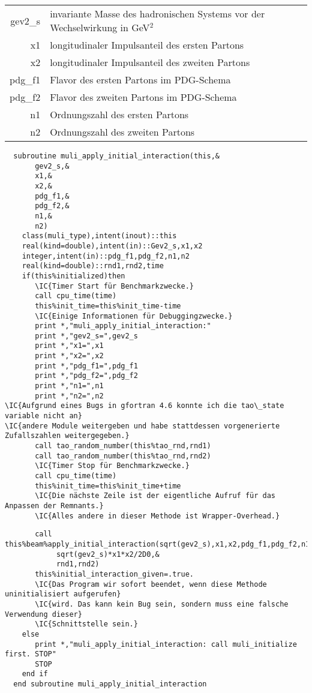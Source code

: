 \begin{tabular}{rl}
  gev2\_s&invariante Masse des hadronischen Systems vor der Wechselwirkung in GeV$^2$\\
  x1&longitudinaler Impulsanteil des ersten Partons\\
  x2&longitudinaler Impulsanteil des zweiten Partons\\
  pdg\_f1&Flavor des ersten Partons im PDG-Schema\\
  pdg\_f2&Flavor des zweiten Partons im PDG-Schema\\
  n1&Ordnungszahl des ersten Partons\\
  n2&Ordnungszahl des zweiten Partons
\end{tabular}
\begin{Verbatim}
  subroutine muli_apply_initial_interaction(this,&
       gev2_s,&
       x1,&
       x2,&
       pdg_f1,&
       pdg_f2,&
       n1,&
       n2)
    class(muli_type),intent(inout)::this
    real(kind=double),intent(in)::Gev2_s,x1,x2
    integer,intent(in)::pdg_f1,pdg_f2,n1,n2
    real(kind=double)::rnd1,rnd2,time
    if(this%initialized)then
       \IC{Timer Start für Benchmarkzwecke.}
       call cpu_time(time)
       this%init_time=this%init_time-time
       \IC{Einige Informationen für Debuggingzwecke.}
       print *,"muli_apply_initial_interaction:"
       print *,"gev2_s=",gev2_s
       print *,"x1=",x1
       print *,"x2=",x2
       print *,"pdg_f1=",pdg_f1
       print *,"pdg_f2=",pdg_f2
       print *,"n1=",n1
       print *,"n2=",n2
\IC{Aufgrund eines Bugs in gfortran 4.6 konnte ich die tao\_state variable nicht an}
\IC{andere Module weitergeben und habe stattdessen vorgenerierte Zufallszahlen weitergegeben.}
       call tao_random_number(this%tao_rnd,rnd1)
       call tao_random_number(this%tao_rnd,rnd2)
       \IC{Timer Stop für Benchmarkzwecke.}
       call cpu_time(time)
       this%init_time=this%init_time+time
       \IC{Die nächste Zeile ist der eigentliche Aufruf für das Anpassen der Remnants.}
       \IC{Alles andere in dieser Methode ist Wrapper-Overhead.}
\end{Verbatim}

\begin{Verbatim}
       call this%beam%apply_initial_interaction(sqrt(gev2_s),x1,x2,pdg_f1,pdg_f2,n1,n2,&
            sqrt(gev2_s)*x1*x2/2D0,&
            rnd1,rnd2)
       this%initial_interaction_given=.true.
       \IC{Das Program wir sofort beendet, wenn diese Methode uninitialisiert aufgerufen}
       \IC{wird. Das kann kein Bug sein, sondern muss eine falsche Verwendung dieser}
       \IC{Schnittstelle sein.}
    else
       print *,"muli_apply_initial_interaction: call muli_initialize first. STOP"
       STOP
    end if
  end subroutine muli_apply_initial_interaction
\end{Verbatim}

